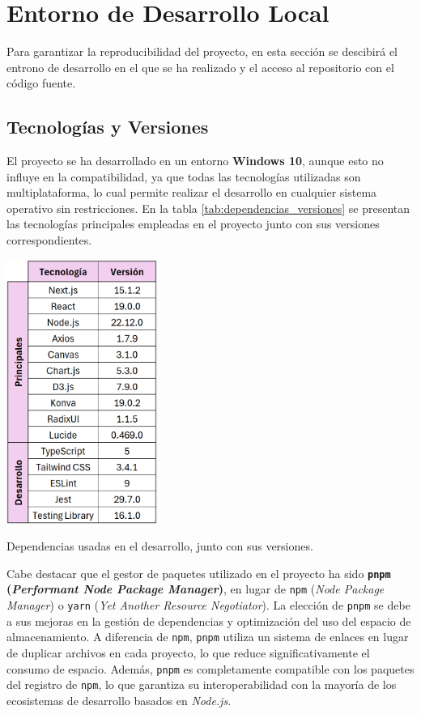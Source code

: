 \section{Entorno de Desarrollo Local}

Para garantizar la reproducibilidad del proyecto, en esta sección se descibirá el entrono de desarrollo en el que se ha realizado y el acceso al repositorio con el código fuente.

\subsection{Tecnologías y Versiones}

El proyecto se ha desarrollado en un entorno \textbf{Windows 10}, aunque esto no influye en la compatibilidad, ya que todas las tecnologías utilizadas son multiplataforma, lo cual permite realizar el desarrollo en cualquier sistema operativo sin restricciones. En la tabla \ref{tab:dependencias_versiones} se presentan las tecnologías principales empleadas en el proyecto junto con sus versiones correspondientes.

\begin{table}[htbp]
    \centering
    \includegraphics[width=0.37\textwidth]{figures/dependencias_versiones.png}
    \captionsetup{skip=5pt}
    \caption{Dependencias usadas en el desarrollo, junto con sus versiones.}
    \label{tab:dependencias_versiones}
\end{table}

Cabe destacar que el gestor de paquetes utilizado en el proyecto ha sido \textbf{\texttt{pnpm} (\textit{Performant Node Package Manager})}, en lugar de \texttt{npm} (\textit{Node Package Manager}) o \texttt{yarn} (\textit{Yet Another Resource Negotiator}). La elección de \texttt{pnpm} se debe a sus mejoras en la gestión de dependencias y optimización del uso del espacio de almacenamiento. A diferencia de \texttt{npm}, \texttt{pnpm} utiliza un sistema de enlaces en lugar de duplicar archivos en cada proyecto, lo que reduce significativamente el consumo de espacio. Además, \texttt{pnpm} es completamente compatible con los paquetes del registro de \texttt{npm}, lo que garantiza su interoperabilidad con la mayoría de los ecosistemas de desarrollo basados en \textit{Node.js}.

